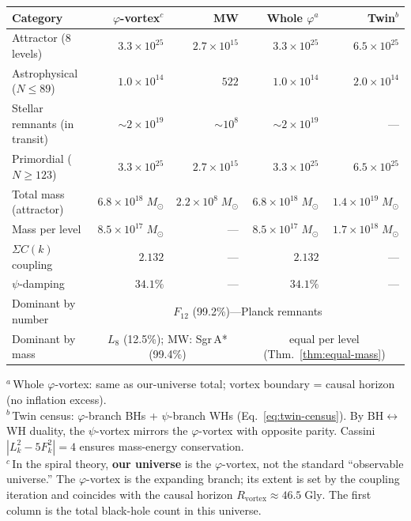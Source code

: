 \documentclass[12pt,a4paper]{article}
\begin{document}
\begin{center}\scriptsize
\begin{tabular}{l|r|r|r|r}
\textbf{Category} & \textbf{$\varphi$-vortex}$^c$ & \textbf{MW} & \textbf{Whole $\varphi$}$^a$ & \textbf{Twin}$^b$ \\
\hline
Attractor (8 levels) & $3.3 \times 10^{25}$ & $2.7 \times 10^{15}$ & $3.3 \times 10^{25}$ & $6.5 \times 10^{25}$ \\
Astrophysical ($N \leq 89$) & $1.0 \times 10^{14}$ & $522$ & $1.0 \times 10^{14}$ & $2.0 \times 10^{14}$ \\
Stellar remnants (in transit) & $\sim 2 \times 10^{19}$ & $\sim 10^{8}$ & $\sim 2 \times 10^{19}$ & --- \\
Primordial ($N \geq 123$) & $3.3 \times 10^{25}$ & $2.7 \times 10^{15}$ & $3.3 \times 10^{25}$ & $6.5 \times 10^{25}$ \\
\hline
Total mass (attractor) & $6.8 \times 10^{18}\;M_\odot$ & $2.2 \times 10^{8}\;M_\odot$ & $6.8 \times 10^{18}\;M_\odot$ & $1.4 \times 10^{19}\;M_\odot$ \\
Mass per level & $8.5 \times 10^{17}\;M_\odot$ & --- & $8.5 \times 10^{17}\;M_\odot$ & $1.7 \times 10^{18}\;M_\odot$ \\
\hline
$\Sigma C(k)$ coupling & $2.132$ & --- & $2.132$ & --- \\
$\psi$-damping & $34.1\%$ & --- & $34.1\%$ & --- \\
\hline
Dominant by number & \multicolumn{4}{c}{$F_{12}$ (99.2\%)---Planck remnants} \\
Dominant by mass & \multicolumn{2}{c|}{$L_8$ (12.5\%); MW: Sgr\,A* (99.4\%)} & \multicolumn{2}{c}{equal per level (Thm.~\ref{thm:equal-mass})} \\
\end{tabular}

\vspace{2pt}
{\footnotesize\begin{minipage}[t]{\dimexpr\textwidth-2em}
$^a$\,Whole $\varphi$-vortex: same as our-universe total; vortex boundary = causal horizon (no inflation excess).\\
$^b$\,Twin census: $\varphi$-branch BHs + $\psi$-branch WHs (Eq.~\ref{eq:twin-census}). By BH$\leftrightarrow$WH duality, the $\psi$-vortex mirrors the $\varphi$-vortex with opposite parity. Cassini $|L_k^2 - 5F_k^2| = 4$ ensures mass-energy conservation.\\
$^c$\,In the spiral theory, \textbf{our universe} is the $\varphi$-vortex, not the standard ``observable universe.'' The $\varphi$-vortex is the expanding branch; its extent is set by the coupling iteration and coincides with the causal horizon $R_{\mathrm{vortex}} \approx 46.5\;\mathrm{Gly}$. The first column is the total black-hole count in this universe.
\end{minipage}}
\end{center}
\end{document}
